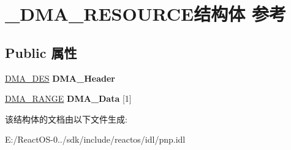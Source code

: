 \hypertarget{struct___d_m_a___r_e_s_o_u_r_c_e}{}\section{\+\_\+\+D\+M\+A\+\_\+\+R\+E\+S\+O\+U\+R\+C\+E结构体 参考}
\label{struct___d_m_a___r_e_s_o_u_r_c_e}
\subsection*{Public 属性}
\begin{DoxyCompactItemize}
\item 
\mbox{\label{struct___d_m_a___r_e_s_o_u_r_c_e_a7115138f1e918d93efeeffb2057e7b2c}} 
\hyperlink{struct_d_m_a___des__s}{D\+M\+A\+\_\+\+D\+ES} {\bfseries D\+M\+A\+\_\+\+Header}
\item 
\mbox{\label{struct___d_m_a___r_e_s_o_u_r_c_e_aaa9d4a70f02fcb0cb65dbde0f1333d8e}} 
\hyperlink{struct_d_m_a___range__s}{D\+M\+A\+\_\+\+R\+A\+N\+GE} {\bfseries D\+M\+A\+\_\+\+Data} \mbox{[}1\mbox{]}
\end{DoxyCompactItemize}


该结构体的文档由以下文件生成\+:\begin{DoxyCompactItemize}
\item 
E\+:/\+React\+O\+S-\/0../sdk/include/reactos/idl/pnp.\+idl\end{DoxyCompactItemize}
